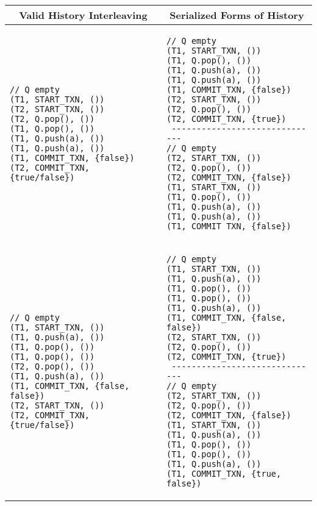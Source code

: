 \begin{table}[H]
    \centering
    \singlespace
    \begin{tabular}{|l|l|}
        \hline
\multicolumn{1}{|c|}{Valid History Interleaving} & \multicolumn{1}{c|}{Serialized Forms of History}\\
        \hline
\begin{lstlisting}
// Q empty
(T1, START_TXN, ())                       
(T2, START_TXN, ())                       
(T2, Q.pop(), ())                       
(T1, Q.pop(), ())                       
(T1, Q.push(a), ())                       
(T1, Q.push(a), ())                       
(T1, COMMIT_TXN, {false})                       
(T2, COMMIT_TXN, {true/false})                       
\end{lstlisting} &
\begin{lstlisting}
// Q empty
(T1, START_TXN, ())                       
(T1, Q.pop(), ())                       
(T1, Q.push(a), ())                       
(T1, Q.push(a), ())                       
(T1, COMMIT_TXN, {false})                       
(T2, START_TXN, ())                       
(T2, Q.pop(), ())                       
(T2, COMMIT_TXN, {true})                       
 ------------------------------
// Q empty
(T2, START_TXN, ())                       
(T2, Q.pop(), ())                       
(T2, COMMIT_TXN, {false})                       
(T1, START_TXN, ())                       
(T1, Q.pop(), ())                       
(T1, Q.push(a), ())                       
(T1, Q.push(a), ())                       
(T1, COMMIT_TXN, {false})                       
\end{lstlisting}\\
\hline
\begin{lstlisting}
// Q empty
(T1, START_TXN, ())                       
(T1, Q.push(a), ())                       
(T1, Q.pop(), ())                       
(T1, Q.pop(), ())                       
(T2, Q.pop(), ())                       
(T1, Q.push(a), ())                       
(T1, COMMIT_TXN, {false, false})                       
(T2, START_TXN, ())                       
(T2, COMMIT_TXN, {true/false})                       
\end{lstlisting} &
\begin{lstlisting}
// Q empty
(T1, START_TXN, ())                       
(T1, Q.push(a), ())                       
(T1, Q.pop(), ())                       
(T1, Q.pop(), ())                       
(T1, Q.push(a), ())                       
(T1, COMMIT_TXN, {false, false})                       
(T2, START_TXN, ())                       
(T2, Q.pop(), ())                       
(T2, COMMIT_TXN, {true})                       
 ------------------------------
// Q empty
(T2, START_TXN, ())                       
(T2, Q.pop(), ())                       
(T2, COMMIT_TXN, {false})                       
(T1, START_TXN, ())                       
(T1, Q.push(a), ())                       
(T1, Q.pop(), ())                       
(T1, Q.pop(), ())                       
(T1, Q.push(a), ())                       
(T1, COMMIT_TXN, {true, false})                       
\end{lstlisting}\\
    \hline
    

\end{tabular}
\end{table}
